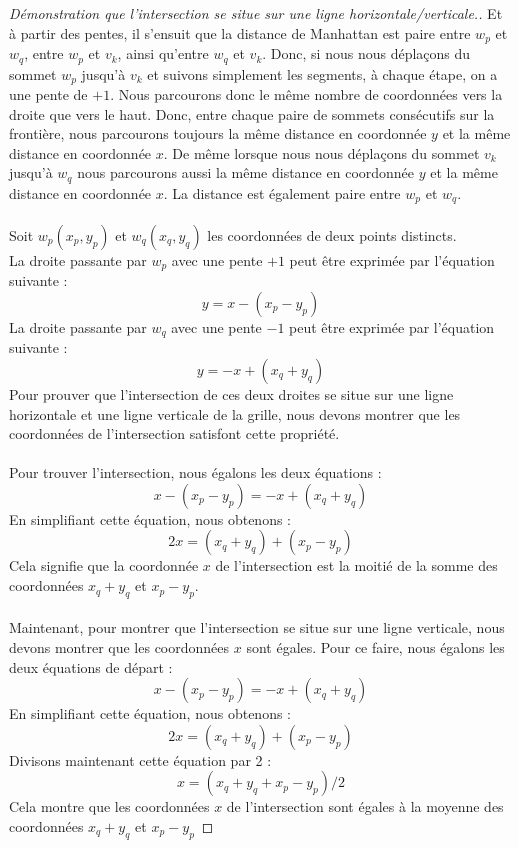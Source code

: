 \documentclass[hidelinks,letterpaper,12pt]{article}
\begin{document}
\begin{proof}[Démonstration que l'intersection se situe sur une ligne horizontale/verticale.]
 Et à partir des pentes, il s'ensuit que la distance de Manhattan est paire entre $w_p$ et $w_q$, entre $w_p$ et  $v_k$, ainsi qu'entre $w_q$ et $v_k$. Donc, si nous nous déplaçons du sommet $w_p$ jusqu'à $v_k$ et suivons simplement les segments, à chaque étape, on a une pente de $+1$. Nous parcourons donc le même nombre de coordonnées vers la droite que vers le haut. Donc, entre chaque paire de sommets consécutifs sur la frontière, nous parcourons toujours la même distance en coordonnée $y$ et la même distance en coordonnée $x$. De même lorsque nous nous déplaçons du sommet $v_k$ jusqu'à $w_q$ nous parcourons aussi la même distance en coordonnée $y$ et la même distance en coordonnée $x$. La distance est également paire entre $w_p$ et $w_q$.
\\ \\
Soit \(w_p(x_p, y_p)\) et \(w_q(x_q, y_q)\) les coordonnées de deux points distincts. 
\\
La droite passante par $w_p$ avec une pente $+1$ peut être exprimée par l'équation suivante : 
\[y = x - (x_p - y_p)\]
La droite passante par $w_q$ avec une pente $-1$ peut être exprimée par l'équation suivante : 
\[y = -x + (x_q + y_q)\]
Pour prouver que l'intersection de ces deux droites se situe sur une ligne horizontale et une ligne verticale de la grille, nous devons montrer que les coordonnées de l'intersection satisfont cette propriété.
\\ \\
Pour trouver l'intersection, nous égalons les deux équations :
\[ x - (x_p - y_p) = -x + (x_q + y_q) \]
En simplifiant cette équation, nous obtenons :
\[2x = (x_q + y_q) + (x_p - y_p)\]
Cela signifie que la coordonnée $x$ de l'intersection est la moitié de la somme des coordonnées \(x_q + y_q \) et \( x_p - y_p\).
\\ \\
Maintenant, pour montrer que l'intersection se situe sur une ligne verticale, nous devons montrer que les coordonnées $x$ sont égales. Pour ce faire, nous égalons les deux équations de départ :
\[x - (x_p - y_p) = -x + (x_q + y_q)\]
En simplifiant cette équation, nous obtenons :
\[2x = (x_q + y_q) + (x_p - y_p)\]
Divisons maintenant cette équation par 2 :
\[x = (x_q + y_q + x_p - y_p) / 2\]
Cela montre que les coordonnées $x$ de l'intersection sont égales à la moyenne des coordonnées \(x_q + y_q \) et \( x_p - y_p\)

\end{proof}
\end{document}
